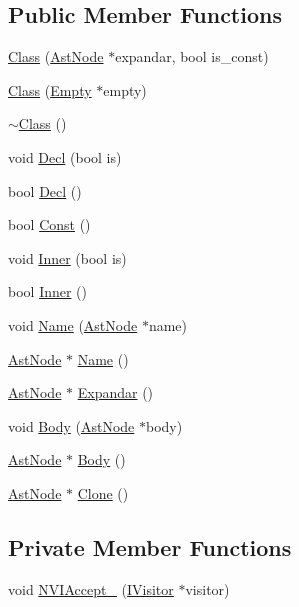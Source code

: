 \subsection*{Public Member Functions}
\begin{DoxyCompactItemize}
\item 
\hyperlink{classmocha_1_1_class_a62374fd7f1beb337a73aa01bd7439e7b}{Class} (\hyperlink{classmocha_1_1_ast_node}{AstNode} $\ast$expandar, bool is\_\-const)
\item 
\hyperlink{classmocha_1_1_class_a5cd3954807966092eaf67a9d69da9df8}{Class} (\hyperlink{classmocha_1_1_empty}{Empty} $\ast$empty)
\item 
\hyperlink{classmocha_1_1_class_ac3db71226540e4f8376336add0a4a254}{$\sim$Class} ()
\item 
void \hyperlink{classmocha_1_1_class_a2cd99dd8829da45fd2cf92fd01392e7d}{Decl} (bool is)
\item 
bool \hyperlink{classmocha_1_1_class_a14ba1ee79fce913bcb11b5aaf2b58bce}{Decl} ()
\item 
bool \hyperlink{classmocha_1_1_class_a92570a6f6bf128a8a1b1c6209ebd42b3}{Const} ()
\item 
void \hyperlink{classmocha_1_1_class_aa0211babf6c2749339b01df68007e25e}{Inner} (bool is)
\item 
bool \hyperlink{classmocha_1_1_class_a411819b382d409b02f8a1692217b2c7e}{Inner} ()
\item 
void \hyperlink{classmocha_1_1_class_a31eda936b0126c8d587e614ced93e6c6}{Name} (\hyperlink{classmocha_1_1_ast_node}{AstNode} $\ast$name)
\item 
\hyperlink{classmocha_1_1_ast_node}{AstNode} $\ast$ \hyperlink{classmocha_1_1_class_ae077c4bc52c0491e714b6d17d42e4345}{Name} ()
\item 
\hyperlink{classmocha_1_1_ast_node}{AstNode} $\ast$ \hyperlink{classmocha_1_1_class_a6042b9b30d7990c238689c71dfb32022}{Expandar} ()
\item 
void \hyperlink{classmocha_1_1_class_afaf4f84b9a2e0a787e02b8fdda9e0b71}{Body} (\hyperlink{classmocha_1_1_ast_node}{AstNode} $\ast$body)
\item 
\hyperlink{classmocha_1_1_ast_node}{AstNode} $\ast$ \hyperlink{classmocha_1_1_class_ac20dd6b3e7f6ab234088f757c08bf7d0}{Body} ()
\item 
\hyperlink{classmocha_1_1_ast_node}{AstNode} $\ast$ \hyperlink{classmocha_1_1_class_a801c063381ca42fdab1c478f2ca461b8}{Clone} ()
\end{DoxyCompactItemize}
\subsection*{Private Member Functions}
\begin{DoxyCompactItemize}
\item 
void \hyperlink{classmocha_1_1_class_acb9ec1fb4dc467d73c132c20d510901a}{NVIAccept\_\-} (\hyperlink{classmocha_1_1_i_visitor}{IVisitor} $\ast$visitor)
\end{DoxyCompactItemize}

